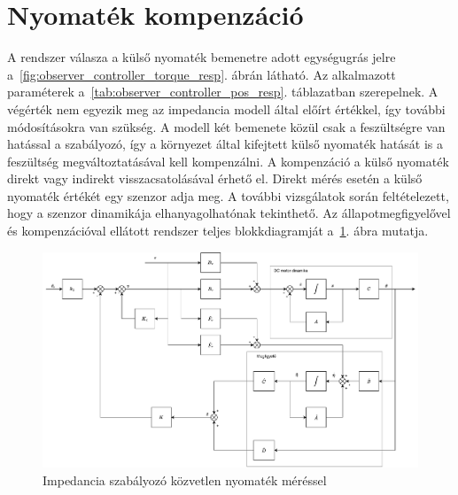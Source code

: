 \section{Nyomaték kompenzáció}
A rendszer válasza a külső nyomaték bemenetre adott egységugrás jelre a~\ref{fig:observer_controller_torque_resp}. ábrán látható. 
Az alkalmazott paraméterek a~\ref{tab:observer_controller_pos_resp}. táblazatban szerepelnek.
A végérték nem egyezik meg az impedancia modell által előírt értékkel, így további módosításokra van szükség.
A modell két bemenete közül csak a feszültségre van hatással a 
szabályozó, így a környezet által kifejtett külső nyomaték 
hatását is a feszültség megváltoztatásával kell kompenzálni. A kompenzáció
a külső nyomaték direkt vagy indirekt visszacsatolásával érhető el.
Direkt mérés esetén a külső nyomaték értékét egy szenzor adja meg.
A további vizsgálatok során feltételezett, hogy a szenzor dinamikája elhanyagolhatónak tekinthető. Az
állapotmegfigyelővel és kompenzációval ellátott rendszer teljes 
blokkdiagramját a~\ref{fig:block_diagram_direct_compensation}. ábra mutatja.
\begin{figure}[ht]
    \begin{center}
    \includegraphics[width=\textwidth]{images/compensated_position_control_torque.pdf}
    \caption{Impedancia szabályozó közvetlen nyomaték méréssel}\label{fig:block_diagram_direct_compensation}
    \end{center}
\end{figure}

